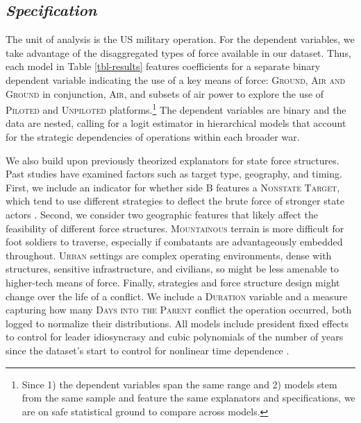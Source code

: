 \documentclass[fleqn,12pt]{article}
\begin{document}
\subsection*{\textit{Specification}}
The unit of analysis is the US military operation. For the dependent variables, we take advantage of the disaggregated types of force available in our dataset. Thus, each model in Table \ref{tbl-results} features coefficients for a separate binary dependent variable indicating the use of a key means of force: \textsc{Ground}, \textsc{Air and Ground} in conjunction, \textsc{Air}, and subsets of air power to explore the use of \textsc{Piloted} and \textsc{Unpiloted} platforms.\footnote{Since 1) the dependent variables span the same range and 2) models stem from the same sample and feature the same explanators and specifications, we are on safe statistical ground to compare across models.} The dependent variables are binary and the data are nested, calling for a logit estimator in hierarchical models that account for the strategic dependencies of operations within each broader war.

We also build upon previously theorized explanators for state force structures. Past studies have examined factors such as target type, geography, and timing. First, we include an indicator for whether side B features a \textsc{Nonstate Target}, which tend to use different strategies to deflect the brute force of stronger state actors \citep{arreguin-toft_howweakwin_2001}. Second, we consider two geographic features that likely affect the feasibility of different force structures. \textsc{Mountainous} terrain is more difficult for foot soldiers to traverse, especially if combatants are advantageously embedded throughout. \textsc{Urban} settings are complex operating environments, dense with structures, sensitive infrastructure, and civilians, so might be less amenable to higher-tech means of force. Finally, strategies and force structure design might change over the life of a conflict. We include a \textsc{Duration} variable and a measure capturing how many \textsc{Days into the Parent} conflict the operation occurred, both logged to normalize their distributions. All models include president fixed effects to control for leader idiosyncrasy and cubic polynomials of the number of years since the dataset's start to control for nonlinear time dependence \citep{carter_backfuturemodeling_2010}.
\end{document}
